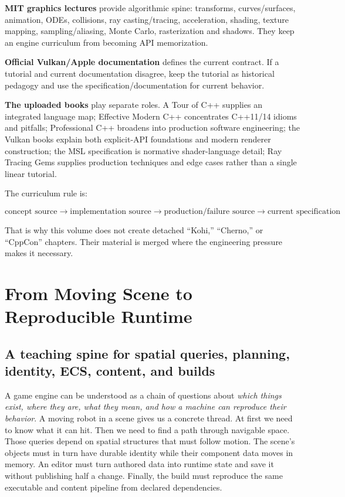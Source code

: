 \textbf{MIT graphics lectures} provide algorithmic spine: transforms, curves/surfaces, animation, ODEs, collisions, ray casting/tracing, acceleration, shading, texture mapping, sampling/aliasing, Monte Carlo, rasterization and shadows. They keep an engine curriculum from becoming API memorization.

\textbf{Official Vulkan/Apple documentation} defines the current contract. If a tutorial and current documentation disagree, keep the tutorial as historical pedagogy and use the specification/documentation for current behavior.

\textbf{The uploaded books} play separate roles. A Tour of C++ supplies an integrated language map; Effective Modern C++ concentrates C++11/14 idioms and pitfalls; Professional C++ broadens into production software engineering; the Vulkan books explain both explicit-API foundations and modern renderer construction; the MSL specification is normative shader-language detail; Ray Tracing Gems supplies production techniques and edge cases rather than a single linear tutorial.

The curriculum rule is:

\[
\boxed{
\text{concept source}
\rightarrow
\text{implementation source}
\rightarrow
\text{production/failure source}
\rightarrow
\text{current specification}
}
\]

That is why this volume does not create detached ``Kohi,'' ``Cherno,'' or ``CppCon'' chapters. Their material is merged where the engineering pressure makes it necessary.

\section{From Moving Scene to Reproducible Runtime}\label{05-engine-i-ch008-from-moving-scene-to-reproducible-runtime}

\subsection{A teaching spine for spatial queries, planning, identity, ECS, content, and builds}\label{05-engine-i-ch008-a-teaching-spine-for-spatial-queries-planning-identity-ecs-content-and-builds}

A game engine can be understood as a chain of questions about \emph{which things exist, where they are, what they mean, and how a machine can reproduce their behavior}. A moving robot in a scene gives us a concrete thread. At first we need to know what it can hit. Then we need to find a path through navigable space. Those queries depend on spatial structures that must follow motion. The scene's objects must in turn have durable identity while their component data moves in memory. An editor must turn authored data into runtime state and save it without publishing half a change. Finally, the build must reproduce the same executable and content pipeline from declared dependencies.

